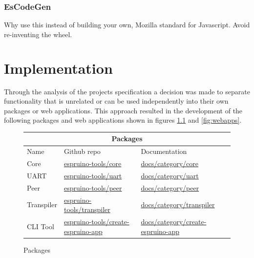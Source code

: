 \documentclass{l4proj}
\begin{document}
\subsection{EsCodeGen }
\text Why use this instead of building your own, Mozilla standard for Javascript. Avoid re-inventing the wheel.
\chapter{Implementation}

\text Through the analysis of the projects specification a decision was made to separate functionality that is unrelated or can be used independently into their own packages or web applications. This approach resulted in the development of the following packages and web applications shown in figures \ref{fig:packages} and \ref{fig:webapps}.

\begin{figure}[!ht]
    
\begin{center}
\begin{tabular}{|p{2.5cm}|p{5.5cm}|p{5.5cm}|}
 \hline
 \multicolumn{3}{|c|}{Packages} \\
 \hline
 Name  & Github repo& Documentation\\
 \hline
Core & \href{https://github.com/espruino-tools/core}{espruino-tools/core}  & \href{https://documentation-xi-liard.vercel.app/docs/category/core}{docs/category/core}  \\

UART & \href{https://github.com/espruino-tools/uart}{espruino-tools/uart}  & \href{https://documentation-xi-liard.vercel.app/docs/category/uart}{docs/category/uart}  \\

Peer & \href{https://github.com/espruino-tools/peer}{espruino-tools/peer}  & \href{https://documentation-xi-liard.vercel.app/docs/category/peer}{docs/category/peer}  \\

Transpiler & \href{https://github.com/espruino-tools/transpiler}{espruino-tools/transpiler}  & \href{https://documentation-xi-liard.vercel.app/docs/category/transpiler}{docs/category/transpiler}  \\

CLI Tool &  \href{https://github.com/espruino-tools/create-espruino-app}{espruino-tools/create-espruino-app}  & \href{https://documentation-xi-liard.vercel.app/docs/category/create-espruino-app}{docs/category/create-espruino-app}  \\
 \hline
\end{tabular}
\end{center} 
    \caption{Packages}
    \label{fig:packages}
\end{figure}
\end{document}
